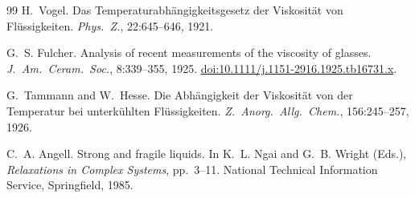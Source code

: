 \documentclass[12pt,a4paper]{article}
\newcommand{\doi}[1]{\href{https://doi.org/#1}{doi:#1}}
\begin{document}
\begin{thebibliography}{99}
H.~Vogel.
\newblock Das Temperaturabhängigkeitsgesetz der Viskosität von Flüssigkeiten.
\newblock \emph{Phys.~Z.}, 22:645--646, 1921.
 
G.~S. Fulcher.
\newblock Analysis of recent measurements of the viscosity of glasses.
\newblock \emph{J.~Am.~Ceram.~Soc.}, 8:339--355, 1925.
\newblock \doi{10.1111/j.1151-2916.1925.tb16731.x}.
 
G.~Tammann and W.~Hesse.
\newblock Die Abhängigkeit der Viskosität von der Temperatur bei unterkühlten Flüssigkeiten.
\newblock \emph{Z.~Anorg.~Allg.~Chem.}, 156:245--257, 1926.
 
C.~A. Angell.
\newblock Strong and fragile liquids.
\newblock In K.~L. Ngai and G.~B. Wright (Eds.), \emph{Relaxations in Complex Systems}, pp.\ 3--11.
\newblock National Technical Information Service, Springfield, 1985.

\end{thebibliography}
\end{document}
